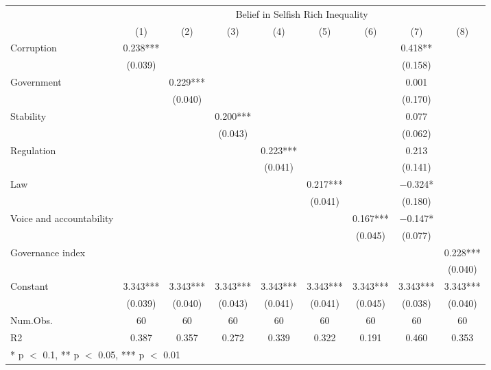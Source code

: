 \begin{table}
\centering
\begin{tabular}[t]{lcccccccc}
\toprule
\multicolumn{1}{c}{ } & \multicolumn{8}{c}{Belief in Selfish Rich Inequality} \\
\cmidrule(l{3pt}r{3pt}){2-9}
  & (1) & (2) & (3) & (4) & (5) & (6) & (7) & (8)\\
\midrule
Corruption & \num{0.238}*** &  &  &  &  &  & \num{0.418}** & \\
 & (\num{0.039}) &  &  &  &  &  & (\num{0.158}) & \\
Government &  & \num{0.229}*** &  &  &  &  & \num{0.001} & \\
 &  & (\num{0.040}) &  &  &  &  & (\num{0.170}) & \\
Stability &  &  & \num{0.200}*** &  &  &  & \num{0.077} & \\
 &  &  & (\num{0.043}) &  &  &  & (\num{0.062}) & \\
Regulation &  &  &  & \num{0.223}*** &  &  & \num{0.213} & \\
 &  &  &  & (\num{0.041}) &  &  & (\num{0.141}) & \\
Law &  &  &  &  & \num{0.217}*** &  & \num{-0.324}* & \\
 &  &  &  &  & (\num{0.041}) &  & (\num{0.180}) & \\
Voice and accountability &  &  &  &  &  & \num{0.167}*** & \num{-0.147}* & \\
 &  &  &  &  &  & (\num{0.045}) & (\num{0.077}) & \\
Governance index &  &  &  &  &  &  &  & \num{0.228}***\\
 &  &  &  &  &  &  &  & (\num{0.040})\\
Constant & \num{3.343}*** & \num{3.343}*** & \num{3.343}*** & \num{3.343}*** & \num{3.343}*** & \num{3.343}*** & \num{3.343}*** & \num{3.343}***\\
 & (\num{0.039}) & (\num{0.040}) & (\num{0.043}) & (\num{0.041}) & (\num{0.041}) & (\num{0.045}) & (\num{0.038}) & (\num{0.040})\\
\midrule
Num.Obs. & \num{60} & \num{60} & \num{60} & \num{60} & \num{60} & \num{60} & \num{60} & \num{60}\\
R2 & \num{0.387} & \num{0.357} & \num{0.272} & \num{0.339} & \num{0.322} & \num{0.191} & \num{0.460} & \num{0.353}\\
\bottomrule
\multicolumn{9}{l}{\rule{0pt}{1em}* p $<$ 0.1, ** p $<$ 0.05, *** p $<$ 0.01}\\
\end{tabular}
\end{table}